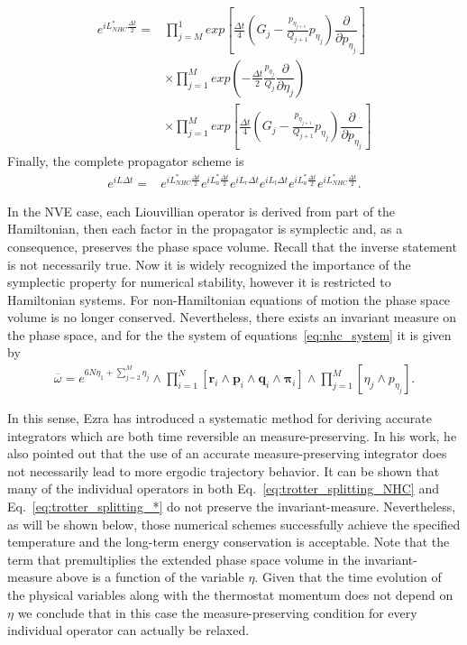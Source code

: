 \documentclass[aip,jcp,reprint,amsmath,amssymb,amsfont]{revtex4-1}
\newcommand{\vt}[1]{\boldsymbol{\mathbf{#1}}}           %
\newcommand{\diff}[2]{\dfrac{\partial #1}{\partial #2}} %
\begin{document}
\begin{equation}
\begin{split}
e^{iL^\ast_{NHC} \frac{\Delta t}{2}} = &\prod_{j=M}^{1} exp\left[\frac{\Delta t}{4} \left( G_j - \frac{p_{\eta_{j+1}}}{Q_{j+1}} p_{\eta_j} \right) \diff{}{p_{\eta_j}}\right] \\
&\times\prod_{j=1}^{M} exp\left(-\frac{\Delta t}{2}  \frac{p_{\eta_j}}{Q_j}\diff{}{\eta_j}\right)   \\
&\times \prod_{j=1}^{M} exp\left[\frac{\Delta t}{4} \left( G_j - \frac{p_{\eta_{j+1}}}{Q_{j+1}} p_{\eta_j} \right) \diff{}{p_{\eta_j}}\right]
\end{split}
\end{equation}
Finally, the complete propagator scheme is
\begin{equation}
\label{eq:trotter_splitting_*}
\begin{split}
e^{i L \Delta t} = &e^{i L^\ast_{NHC} \frac{\Delta t}{2}} e^{i L^\ast_a \frac{\Delta t}{2}} e^{i L_r \Delta t} e^{i L_t \Delta t} e^{i L^\ast_a \frac{\Delta t}{2}} e^{i L^\ast_{NHC} \frac{\Delta t}{2}}.
\end{split}
\end{equation}

In the NVE case, each Liouvillian operator is derived from part of the Hamiltonian, then each factor in the propagator is symplectic and, as a consequence, preserves the phase space volume. Recall that the inverse statement is not necessarily true. Now it is widely recognized the importance of the symplectic property for numerical stability,\cite{Skeel1997} however it is restricted to Hamiltonian systems. For non-Hamiltonian equations of motion the phase space volume is no longer conserved. Nevertheless, there exists an invariant measure on the phase space, and for the the system of equations~\ref{eq:nhc_system} it is given by
\begin{align*}
\overline{\omega} = e^{6N \eta_1 + \sum_{j=2}^M \eta_j} \wedge \prod_{i=1}^{N}[\vt {r}_i \wedge\vt {p}_i\wedge \vt {q}_i\wedge \vt {\pi}_i ] \wedge \prod_{j=1}^{M}[ \eta_j\wedge p_{\eta_j} ].
\end{align*}

In this sense, Ezra \cite{Ezra2006} has introduced a systematic method for deriving accurate integrators which are both time  reversible an measure-preserving. In his work, he also pointed out that the use of an accurate measure-preserving integrator does not necessarily lead to more ergodic trajectory behavior. It can be shown that many of the individual operators in both Eq.~\ref{eq:trotter_splitting_NHC} and Eq.~\ref{eq:trotter_splitting_*} do not preserve the invariant-measure. Nevertheless, as will be shown below, those numerical schemes successfully achieve the specified temperature and the long-term energy conservation is acceptable. Note that the term that premultiplies the extended phase space volume in the invariant-measure above is a function of the variable $\eta$. Given that the time evolution of the physical variables along with the thermostat momentum does not depend on $\eta$ we conclude that in this case the measure-preserving condition for every individual operator can actually be relaxed.
\end{document}
